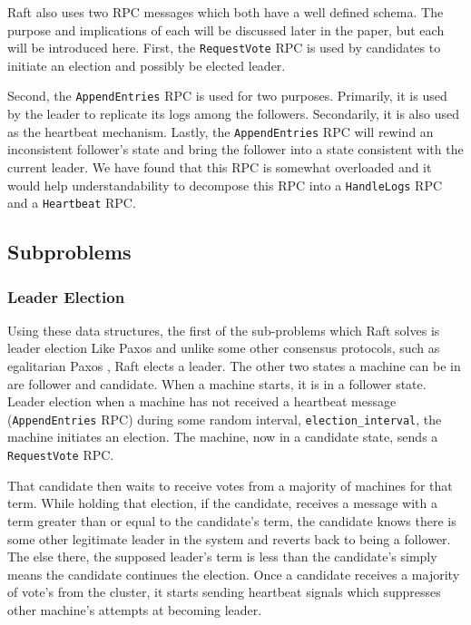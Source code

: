 Raft also uses two RPC messages which both have a well defined schema.
The purpose and implications of each will be discussed later in the paper, but each will be introduced here.
First, the \texttt{RequestVote} RPC is used by candidates to initiate an election and possibly be elected leader.

Second, the \texttt{AppendEntries} RPC is used for two purposes.
Primarily, it is used by the leader to replicate its logs among the followers.
Secondarily, it is also used as the heartbeat mechanism.
Lastly, the \texttt{AppendEntries} RPC will rewind an inconsistent follower's state and bring the follower into a state consistent with the current leader.
We have found that this RPC is somewhat overloaded and it would help understandability to decompose this RPC into a \texttt{HandleLogs} RPC and a \texttt{Heartbeat} RPC.

\subsection{Subproblems}

\subsubsection{Leader Election}

Using these data structures, the first of the sub-problems which Raft solves is leader election
Like Paxos and unlike some other consensus protocols, such as egalitarian Paxos \cite{e-paxos}, Raft elects a leader.
The other two states a machine can be in are follower and candidate.
When a machine starts, it is in a follower state.
Leader election when a machine has not received a heartbeat message (\texttt{AppendEntries} RPC) during some random interval, \texttt{election\_interval}, the machine initiates an election.
The machine, now in a candidate state, sends a \texttt{RequestVote} RPC.

That candidate then waits to receive votes from a majority of machines for that term.
While holding that election, if the candidate, receives a message with a term greater than or equal to the candidate's term, the candidate knows there is some other legitimate leader in the system and reverts back to being a follower.
The else there, the supposed leader's term is less than the candidate's simply means the candidate continues the election.
Once a candidate receives a majority of vote's from the cluster, it starts sending heartbeat signals which suppresses other machine's attempts at becoming leader.

